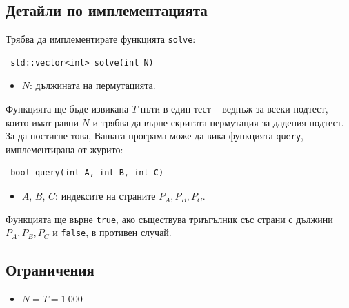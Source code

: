 \documentclass[12pt]{article}
\begin{document}

\subsection{Детайли по имплементацията}
Трябва да имплементирате функцията \texttt{solve}:
\begin{lstlisting}
 std::vector<int> solve(int N)
\end{lstlisting}
\begin{itemize}
	\item $N$: дължината на пермутацията.%
\end{itemize}

Функцията ще бъде извикана $T$ пъти в един тест -- веднъж за всеки подтест, които имат равни $N$ и трябва да върне скритата пермутация за дадения подтест. За да постигне това, Вашата програма може да вика функцията \texttt{query}, имплементирана от журито:
\begin{lstlisting}
 bool query(int A, int B, int C)
\end{lstlisting}
\begin{itemize}
	\item $A$, $B$, $C$: индексите на страните $P_A, P_B, P_C$.%
\end{itemize}

Функцията ще върне \texttt{true}, ако съществува триъгълник със страни с дължини $P_A, P_B, P_C$  и \texttt{false}, в противен случай. %

\subsection{Ограничения}
\vspace{0.1em}
\begin{itemize}
	\item $N = T = 1~000$
\end{itemize}
\end{document}
